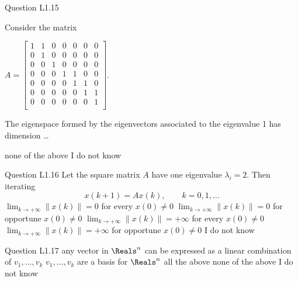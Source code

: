 \begin{frame}{Question L1.15}
	\QuestionNotes{}
	\QuestionBody
	{
		Consider the matrix
		\begin{small}
		$
		A = 
		\begin{bmatrix}
			1 & 1 & 0 & 0 & 0 & 0 & 0 \\
			0 & 1 & 0 & 0 & 0 & 0 & 0 \\
			0 & 0 & 1 & 0 & 0 & 0 & 0 \\
			0 & 0 & 0 & 1 & 1 & 0 & 0 \\
			0 & 0 & 0 & 0 & 1 & 1 & 0 \\
			0 & 0 & 0 & 0 & 0 & 1 & 1 \\
			0 & 0 & 0 & 0 & 0 & 0 & 1 \\
		\end{bmatrix} .
		$
		\end{small}
		The eigenspace formed by the eigenvectors associated to the eigenvalue 1 has dimension \ldots
	}
	\QuestionAnswers
	{
		\answer none of the above
		\answer I do not know
	}
\end{frame}


\begin{frame}{Question L1.16}
	\QuestionNotes{}
	\QuestionBody
	{
		Let the square matrix $A$ have one eigenvalue $\lambda_{i} = 2$. Then iterating
		$$ x(k+1) = A x(k), \qquad k = 0, 1, \ldots $$
	}
	\QuestionAnswers
	{
		\answer $\lim_{k \rightarrow +\infty} \left\| x(k) \right\| = 0$ for every $x(0) \neq 0$
		\answer $\lim_{k \rightarrow +\infty} \left\| x(k) \right\| = 0$ for opportune $x(0) \neq 0$
		\answer $\lim_{k \rightarrow +\infty} \left\| x(k) \right\| = + \infty$ for every $x(0) \neq 0$
		\correctanswer $\lim_{k \rightarrow +\infty} \left\| x(k) \right\| = + \infty$ for opportune $x(0) \neq 0$
		\answer I do not know
	}
\end{frame}


\begin{frame}{Question L1.17}
	\QuestionNotes{}
	\QuestionAnswers
	{
		\answer any vector in $\Reals^{n}$ can be expressed as a linear combination of $v_{1}, \ldots, v_{k}$
		\answer $v_{1}, \ldots, v_{k}$ are a basis for $\Reals^{n}$
		\answer all the above
		\correctanswer none of the above
		\answer I do not know
	}
\end{frame}


